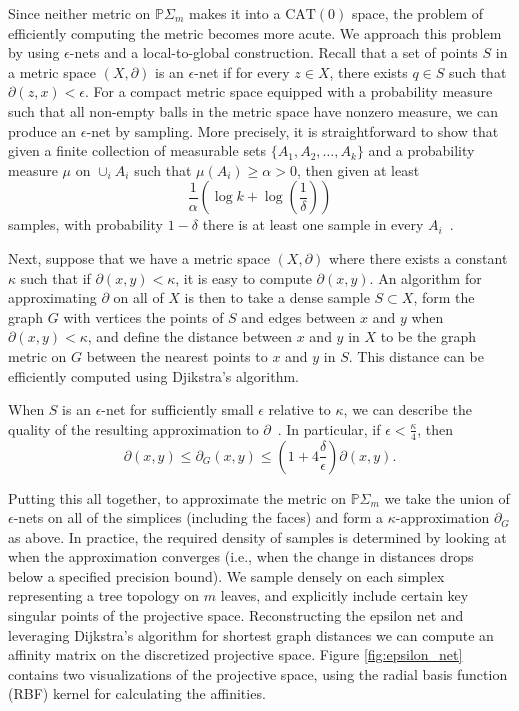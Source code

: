 \documentclass[a4paper,11pt]{article}
\newcommand{\CAT}{\textrm{CAT}}
\begin{document}
Since neither metric on $\mathbb{P} \Sigma_m$ makes it into a $\CAT(0)$ space, the problem of efficiently computing the metric becomes more acute.
We approach this problem by using $\epsilon$-nets and a local-to-global construction.
Recall that a set of points $S$ in a metric space $(X,\partial)$ is an $\epsilon$-net if for every $z \in X$, there exists $q \in S$ such that $\partial(z,x) < \epsilon$.
For a compact metric space equipped with a probability measure such that all non-empty balls in the metric space have nonzero measure, we can produce an $\epsilon$-net by sampling.
More precisely, it is straightforward to show that given a finite collection of measurable sets $\{A_1, A_2, \ldots, A_k\}$ and a probability measure $\mu$ on $\cup_i A_i$ such that $\mu(A_i) \geq \alpha > 0$, then given at least 
\[
\frac{1}{\alpha}\left(\log k + \log(\frac{1}{\delta})\right)
\]
samples, with probability $1-\delta$ there is at least one sample in every $A_i$~\cite[5.1]{niyogi2008finding}.

Next, suppose that we have a metric space $(X,\partial)$ where there exists a constant $\kappa$ such that if $\partial(x,y) < \kappa$, it is easy to compute $\partial(x,y)$.
An algorithm for approximating $\partial$ on all of $X$ is then to take a dense sample $S \subset X$, form the graph $G$ with vertices the points of $S$ and edges between $x$ and $y$ when $\partial(x,y) < \kappa$, and define the distance between $x$ and $y$ in $X$ to be the graph metric on $G$ between the nearest points to $x$ and $y$ in $S$.
This distance can be efficiently computed using Djikstra's algorithm.

When $S$ is an $\epsilon$-net for sufficiently small $\epsilon$ relative to $\kappa$, we can describe the quality of the resulting approximation to $\partial$~\cite[Thm. 2]{bernstein2000graph}.
In particular, if $\epsilon < \frac{\kappa}{4}$, then 
\[
\partial(x,y) \leq \partial_G(x,y) \leq (1 + 4\frac{\delta}{\epsilon}) \partial(x,y).
\]

Putting this all together, to approximate the metric on $\mathbb{P}\Sigma_m$ we take the union of $\epsilon$-nets on all of the simplices (including the faces) and form a $\kappa$-approximation $\partial_G$ as above.
In practice, the required density of samples is determined by looking at when the approximation converges (i.e., when the change in distances drops below a specified precision bound).
We sample densely on each simplex representing a tree topology on $m$ leaves, and explicitly include certain key singular points of the projective space.
Reconstructing the epsilon net and leveraging Dijkstra's algorithm for shortest graph distances we can compute an affinity matrix on the discretized projective space.
Figure \ref{fig:epsilon_net} contains two visualizations of the projective space, using the radial basis function (RBF) kernel for calculating the affinities.
\end{document}
